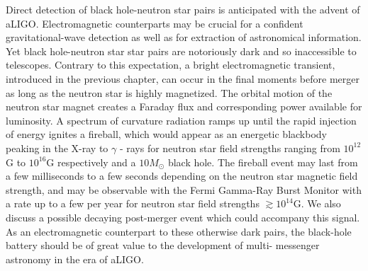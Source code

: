 \documentclass[12pt,letterpaper]{article}
\begin{document}
Direct detection of black hole-neutron star pairs is anticipated with the
advent of aLIGO.  Electromagnetic counterparts may be crucial for a confident
gravitational-wave detection as well as for extraction of astronomical
information. Yet black hole-neutron star star pairs are notoriously dark and
so inaccessible to telescopes.  Contrary to this expectation, a bright
electromagnetic transient, introduced in the previous chapter, can occur in
the final moments before merger as long as the neutron star is highly
magnetized.  The orbital motion of the neutron star magnet creates a Faraday
flux and corresponding power available for luminosity. A spectrum of curvature
radiation ramps up until the rapid injection of energy ignites a fireball,
which would appear as an energetic blackbody peaking in the X-ray to $\gamma$
- rays for neutron star field strengths ranging from $10^{12}$G to $10^{16}$G
respectively and a $10M_{\odot} $ black hole. The fireball event may last from
a few milliseconds to a few seconds depending on the neutron star magnetic
field strength, and may be observable with the Fermi Gamma-Ray Burst Monitor
with a rate up to a few per year for neutron star field strengths $\gtrsim
10^{14}$G.  We also discuss a possible decaying post-merger event which could
accompany this signal.  As an electromagnetic counterpart to these otherwise
dark pairs, the black-hole battery should be of great value to the development
of multi- messenger astronomy in the era of aLIGO.




\end{document}
